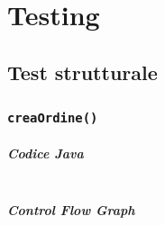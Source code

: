 \chapter{Testing}

\section{Test strutturale}

\subsection{\texttt{creaOrdine()}}

\paragraph{Codice Java}

\inputminted[breaklines,tabsize=4,obeytabs]{java}{chapters/testing_white_box/creaOrdine.java}

\vfill

\pagebreak

\paragraph{Control Flow Graph} \mbox{}\newline

